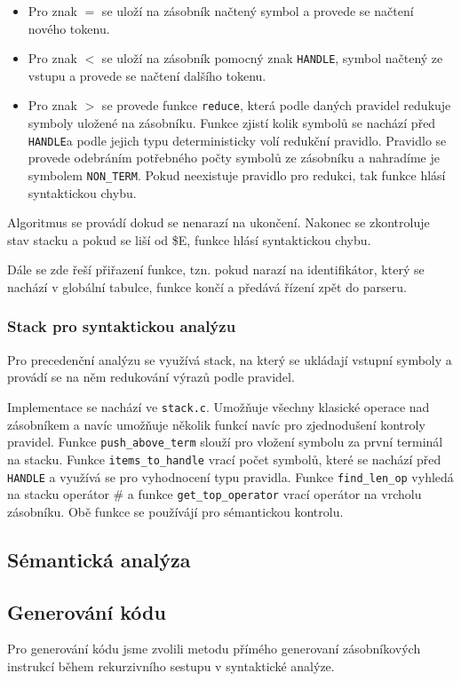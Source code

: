 \documentclass[11pt]{article}
\begin{document}
\begin{itemize}
    \item Pro znak $=$ se uloží na zásobník načtený symbol a provede se načtení nového tokenu.
    \item Pro znak $<$ se uloží na zásobník pomocný znak \texttt{HANDLE}, symbol načtený ze vstupu
        a provede se načtení dalšího tokenu.
    \item Pro znak $>$ se provede funkce \texttt{reduce},
        která podle daných pravidel redukuje symboly uložené na zásobníku.
        Funkce zjistí kolik symbolů se nachází před \texttt{HANDLE}a podle jejich typu deterministicky volí
        redukční pravidlo. Pravidlo se provede odebráním potřebného počty symbolů ze zásobníku
        a nahradíme je symbolem \texttt{NON\_TERM}.
        Pokud neexistuje pravidlo pro redukci, tak funkce hlásí syntaktickou chybu.
\end{itemize}

Algoritmus se provádí dokud se nenarazí na ukončení. Nakonec se zkontroluje stav stacku a pokud se liší od \$E,
funkce hlásí syntaktickou chybu.

Dále se zde řeší přiřazení funkce, tzn. pokud narazí na identifikátor, který se nachází v globální tabulce,
funkce končí a předává řízení zpět do parseru.

\subsubsection{Stack pro syntaktickou analýzu}
Pro precedenční analýzu se využívá stack, na který se ukládají vstupní symboly a provádí se na něm redukování
výrazů podle pravidel.

Implementace se nachází ve \texttt{stack.c}. Umožňuje všechny klasické operace nad zásobníkem a navíc
umožňuje několik funkcí navíc pro zjednodušení kontroly pravidel. Funkce \texttt{push\_above\_term} slouží pro
vložení symbolu za první terminál na stacku. Funkce \texttt{items\_to\_handle} vrací počet symbolů,
které se nachází před \texttt{HANDLE} a využívá se pro vyhodnocení typu pravidla.
Funkce \texttt{find\_len\_op} vyhledá na stacku operátor \# a funkce \texttt{get\_top\_operator} vrací operátor
na vrcholu zásobníku. Obě funkce se používájí pro sémantickou kontrolu.

\subsection{Sémantická analýza}

\subsection{Generování kódu}
Pro generování kódu jsme zvolili metodu přímého generovaní zásobníkových instrukcí během rekurzivního sestupu v syntaktické analýze.
\end{document}
